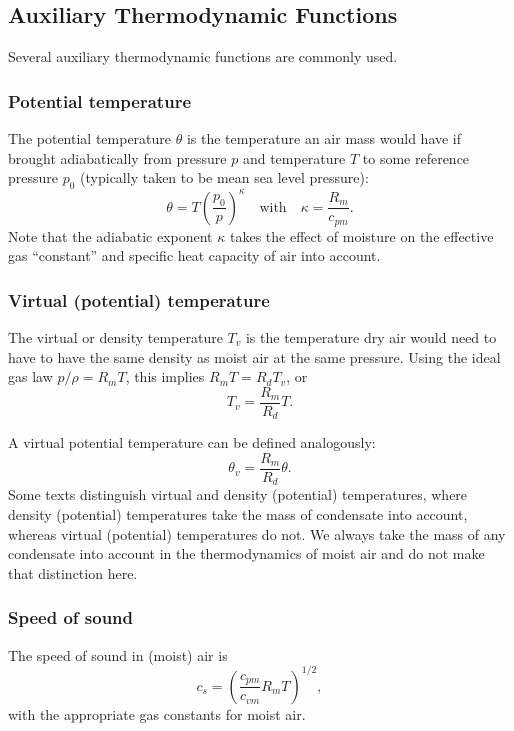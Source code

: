 \documentclass{report}
\begin{document}
\subsection{Auxiliary Thermodynamic Functions}

Several auxiliary thermodynamic functions are commonly used. 

\subsubsection{Potential temperature} The potential temperature $\theta$ is the temperature an air mass would have if brought adiabatically from pressure $p$ and temperature $T$ to some reference pressure $p_0$ (typically taken to be mean sea level pressure):
\begin{equation}\label{e:pot_temp_press_T}
\theta = T \left( \frac{p_0}{p} \right)^\kappa \quad \text{with} \quad \kappa = \frac{R_m}{c_{pm}}.
\end{equation}
Note that the adiabatic exponent $\kappa$ takes the effect of  moisture on the effective gas ``constant'' and specific heat capacity of air into account.

\subsubsection{Virtual (potential) temperature} The virtual or density temperature $T_v$ is the temperature dry air would need to have to have the same density as moist air at the same pressure. Using the ideal gas law $p/\rho = R_m T$, this implies $R_m T  = R_d T_v $, or
\begin{equation}\label{e:virtual_temp}
T_v = \frac{R_m}{R_d} T.
\end{equation}

A virtual potential temperature can be defined analogously:
\begin{equation}\label{e:virtual_pottemp}
\theta_v = \frac{R_m}{R_d} \theta.
\end{equation}
Some texts distinguish virtual and density (potential) temperatures, where density (potential) temperatures take the mass of condensate into account, whereas virtual (potential) temperatures do not. We always take the mass of any condensate into account in the thermodynamics of moist air and do not make that distinction here. 

\subsubsection{Speed of sound} The speed of sound in (moist) air is 
\begin{equation}\label{e:soundspeed}
 c_s = \left(\frac{c_{pm}}{c_{vm}} R_m T \right)^{1/2}, 
\end{equation}
with the appropriate gas constants for moist air.
\end{document}
